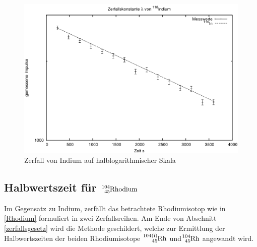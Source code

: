 \begin{figure}[h]
	\includegraphics[width=1\textwidth]{pics/indium.png}
	\caption{Zerfall von Indium auf halblogarithmischer Skala}
\end{figure}

\subsection{Halbwertszeit für $\ce{^{104}_{45}Rhodium}$}
Im Gegensatz zu Indium, zerfällt das betrachtete Rhodiumisotop wie in \eqref{Rhodium} formuliert in zwei Zerfallsreihen.
Am Ende von Abschnitt \ref{zerfallsgesetz} wird die Methode geschildert, welche zur Ermittlung der Halbwertszeiten der beiden
Rhodiumisotope $\ce{^{104(i)}_{45}Rh}$ und$\ce{^{104}_{45}Rh}$ angewandt wird.

